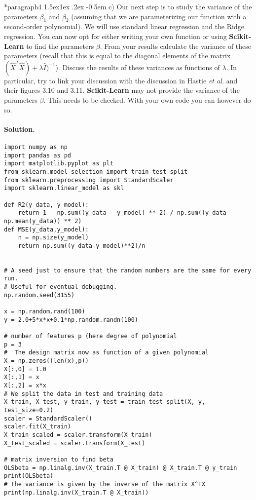 \documentclass[%
oneside,                 %
final,                   %
10pt]{article}
\makeatletter
\newenvironment{doconceexercise}{}{}
\newcommand\subex{\@startsection*{paragraph}{4}{\z@}%
                  {1.5ex\@plus1ex \@minus.2ex}%
                  {-0.5em}%
                  {\normalfont\normalsize\bfseries}}
\makeatother
\begin{document}
\begin{doconceexercise}

\subex{c)}
Our next step is to study the variance of the parameters $\beta_1$ and $\beta_2$ (assuming that we are parameterizing our function with a second-order polynomial). We will use standard linear regression and the Ridge regression.  You can now opt for either writing your own function or using \textbf{Scikit-Learn} to find the parameters $\beta$. From your results calculate the variance of these parameters (recall that this is equal to the diagonal elements of the matrix $(\hat{X}^T\hat{X})+\lambda\hat{I})^{-1}$). Discuss the results of these variances as functions of $\lambda$. In particular, try to link your discussion with the discussion in Hastie \emph{et al.} and their figures 3.10 and  3.11. \textbf{Scikit-Learn} may not provide the variance of the parameters $\beta$. This needs to be checked. With your own code you can however do so.


\paragraph{Solution.}
\begin{verbatim}
import numpy as np
import pandas as pd
import matplotlib.pyplot as plt
from sklearn.model_selection import train_test_split
from sklearn.preprocessing import StandardScaler
import sklearn.linear_model as skl

def R2(y_data, y_model):
    return 1 - np.sum((y_data - y_model) ** 2) / np.sum((y_data - np.mean(y_data)) ** 2)
def MSE(y_data,y_model):
    n = np.size(y_model)
    return np.sum((y_data-y_model)**2)/n


# A seed just to ensure that the random numbers are the same for every run.
# Useful for eventual debugging.
np.random.seed(3155)

x = np.random.rand(100)
y = 2.0+5*x*x+0.1*np.random.randn(100)

# number of features p (here degree of polynomial
p = 3
#  The design matrix now as function of a given polynomial
X = np.zeros((len(x),p))
X[:,0] = 1.0
X[:,1] = x
X[:,2] = x*x
# We split the data in test and training data
X_train, X_test, y_train, y_test = train_test_split(X, y, test_size=0.2)
scaler = StandardScaler()
scaler.fit(X_train)
X_train_scaled = scaler.transform(X_train)
X_test_scaled = scaler.transform(X_test)

# matrix inversion to find beta
OLSbeta = np.linalg.inv(X_train.T @ X_train) @ X_train.T @ y_train
print(OLSbeta)
# The variance is given by the inverse of the matrix X^TX
print(np.linalg.inv(X_train.T @ X_train))


\end{verbatim}
\end{doconceexercise}
\end{document}
